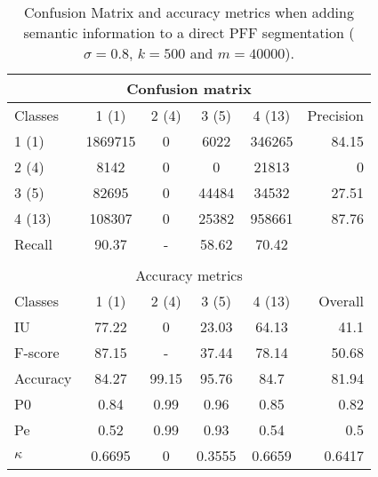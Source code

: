 \begin{table}[H]
\begin{center}
\footnotesize
\begin{tabular}{|l|c|c|c|c|r|}
\hline
\multicolumn{6}{|c|}{Confusion matrix} \\
\hline
 Classes & 1 (1) & 2 (4) & 3 (5) & 4 (13) & Precision \\
\hline
1 (1) & 1869715 & 0 & 6022 & 346265 & 84.15 \\
\hline
2 (4) & 8142 & 0 & 0 & 21813 & 0 \\
\hline
3 (5) & 82695 & 0 & 44484 & 34532 & 27.51 \\
\hline
4 (13) & 108307 & 0 & 25382 & 958661 & 87.76 \\
\hline
Recall & 90.37 & - & 58.62 & 70.42 &  \\
\hline
\multicolumn{6}{c}{ } \\
\hline
\multicolumn{6}{|c|}{Accuracy metrics} \\
\hline
 Classes & 1 (1) & 2 (4) & 3 (5) & 4 (13) & Overall \\
\hline
IU & 77.22 & 0 & 23.03 & 64.13 & 41.1 \\
\hline
F-score & 87.15 & - & 37.44 & 78.14 & 50.68 \\
\hline
Accuracy & 84.27 & 99.15 & 95.76 & 84.7 & 81.94 \\
\hline
P0 & 0.84 & 0.99 & 0.96 & 0.85 & 0.82 \\
\hline
Pe & 0.52 & 0.99 & 0.93 & 0.54 & 0.5 \\
\hline
$\kappa$ & 0.6695 & 0 & 0.3555 & 0.6659 & 0.6417 \\
\hline
\end{tabular}
\caption{Confusion Matrix and accuracy metrics when adding semantic information to a direct PFF segmentation ($\sigma=0.8$, $k=500$ and $m=40000$).}
\label{table:C3_S2_seg_PFF}
\end{center}
\end{table}